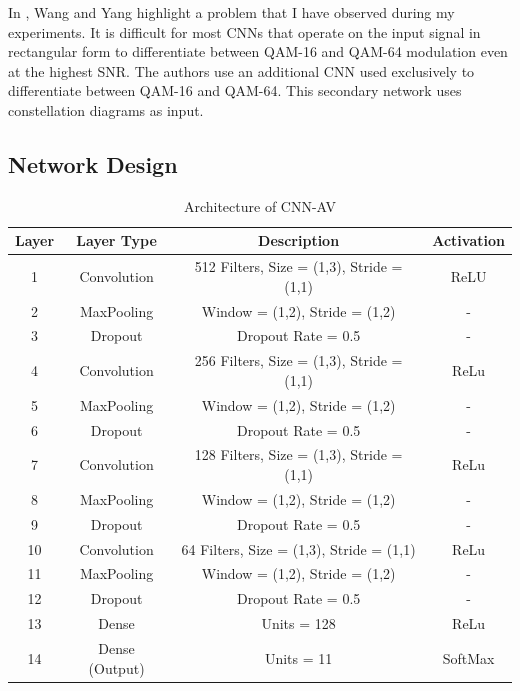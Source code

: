 \documentclass[journal,onecolumn]{IEEEtran}
\begin{document}
In \cite{ddriven}, Wang and Yang highlight a problem that I have observed during my experiments. It is difficult for most CNNs that operate on the input signal in rectangular form to differentiate between QAM-16 and QAM-64 modulation even at the highest SNR. The authors use an additional CNN used exclusively to differentiate between QAM-16 and QAM-64. This secondary network uses constellation diagrams as input.

\subsection{Network Design} 

\begin{table}
\centering
\caption{Architecture of CNN-AV}
\label{tab:my-table-1a}
\begin{tabular}{@{}cccc@{}}
\toprule
Layer & Layer Type  & Description                               & Activation \\ \midrule
1     & Convolution & 512 Filters, Size = (1,3), Stride = (1,1) & ReLU       \\
2     & MaxPooling  & Window = (1,2), Stride = (1,2)            & -          \\
3     & Dropout     & Dropout Rate = 0.5                        & -          \\
4     & Convolution & 256 Filters, Size = (1,3), Stride = (1,1) & ReLu       \\
5     & MaxPooling  & Window = (1,2), Stride = (1,2)            & -          \\
6     & Dropout     & Dropout Rate = 0.5                        & -          \\
7     & Convolution & 128 Filters, Size = (1,3), Stride = (1,1) & ReLu       \\
8     & MaxPooling  & Window = (1,2), Stride = (1,2)            & -          \\
9     & Dropout     & Dropout Rate = 0.5                        & -          \\
10    & Convolution & 64 Filters, Size = (1,3), Stride = (1,1)  & ReLu       \\
11    & MaxPooling  & Window = (1,2), Stride = (1,2)            & -          \\
12    & Dropout     & Dropout Rate = 0.5                        & -          \\
13    & Dense       & Units = 128                               & ReLu       \\
14    & Dense (Output)       & Units = 11                                & SoftMax    \\ \bottomrule
\end{tabular}%
\end{table}
\end{document}

